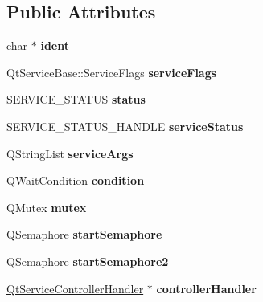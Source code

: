 \subsection*{Public Attributes}
\begin{DoxyCompactItemize}
\item 
\mbox{\label{class_qt_service_sys_private_a5b718dc890ba28a1a8ecc2c292ed3683}} 
char $\ast$ {\bfseries ident}
\item 
\mbox{\label{class_qt_service_sys_private_ab3a1a34e95b1028d2d2437ce5683ce25}} 
Qt\+Service\+Base\+::\+Service\+Flags {\bfseries service\+Flags}
\item 
\mbox{\label{class_qt_service_sys_private_a4eaa8c9fb344d5fcbe52e13d9b563749}} 
S\+E\+R\+V\+I\+C\+E\+\_\+\+S\+T\+A\+T\+US {\bfseries status}
\item 
\mbox{\label{class_qt_service_sys_private_a5794a5ac189b478c944426805b41ae2c}} 
S\+E\+R\+V\+I\+C\+E\+\_\+\+S\+T\+A\+T\+U\+S\+\_\+\+H\+A\+N\+D\+LE {\bfseries service\+Status}
\item 
\mbox{\label{class_qt_service_sys_private_aece0e34030f5abf3ec7bee64b4ab22a3}} 
Q\+String\+List {\bfseries service\+Args}
\item 
\mbox{\label{class_qt_service_sys_private_a8fc09bc3f805b5afe18e5d2a5d42f466}} 
Q\+Wait\+Condition {\bfseries condition}
\item 
\mbox{\label{class_qt_service_sys_private_a13840c7d50506cea8ac099d75ed5bd94}} 
Q\+Mutex {\bfseries mutex}
\item 
\mbox{\label{class_qt_service_sys_private_a2b96b9ff0db26655accab99d6527fe3d}} 
Q\+Semaphore {\bfseries start\+Semaphore}
\item 
\mbox{\label{class_qt_service_sys_private_ab81c4cc12732b32d6962253868fde059}} 
Q\+Semaphore {\bfseries start\+Semaphore2}
\item 
\mbox{\label{class_qt_service_sys_private_ac8834f0ad3dd97b1dfb9e7de563ee5cb}} 
\mbox{\hyperlink{class_qt_service_controller_handler}{Qt\+Service\+Controller\+Handler}} $\ast$ {\bfseries controller\+Handler}
\end{DoxyCompactItemize}
